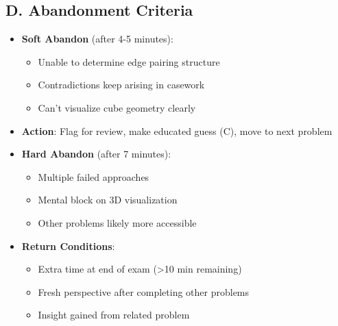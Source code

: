 \documentclass[]{article}
\begin{document}
\begin{competitionbox}
\subsection*{D. Abandonment Criteria}
\begin{itemize}[leftmargin=*]
    \item \textbf{Soft Abandon} (after 4-5 minutes):
    \begin{itemize}
        \item Unable to determine edge pairing structure
        \item Contradictions keep arising in casework
        \item Can't visualize cube geometry clearly
    \end{itemize}
    
    \item \textbf{Action}: Flag for review, make educated guess (C), move to next problem
    
    \item \textbf{Hard Abandon} (after 7 minutes):
    \begin{itemize}
        \item Multiple failed approaches
        \item Mental block on 3D visualization
        \item Other problems likely more accessible
    \end{itemize}
    
    \item \textbf{Return Conditions}:
    \begin{itemize}
        \item Extra time at end of exam (>10 min remaining)
        \item Fresh perspective after completing other problems
        \item Insight gained from related problem
    \end{itemize}
\end{itemize}
\end{competitionbox}
\end{document}
